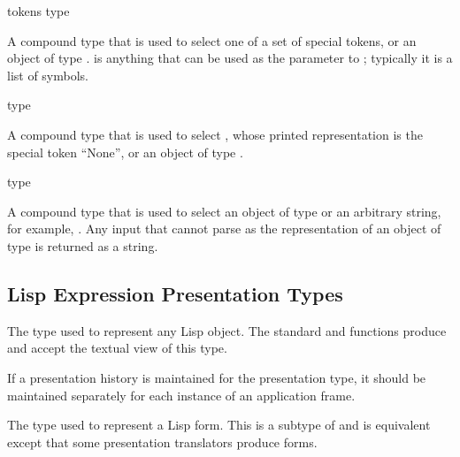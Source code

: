  {tokens type}

A compound type that is used to select one of a set of special tokens, or an
object of type .   is anything that can be used as the
 parameter to ; typically it is a list of
symbols.


 {type}

A compound type that is used to select , whose printed representation is
the special token ``None'', or an object of type .


 {type}

A compound type that is used to select an object of type  or an
arbitrary string, for example, .  Any input that
 cannot parse as the representation of an object of type 
is returned as a string.


\subsection {Lisp Expression Presentation Types}

 {}

The type used to represent any Lisp object.  The standard  and
 functions produce and accept the textual view of this type.

If a presentation history is maintained for the  presentation
type, it should be maintained separately for each instance of an application
frame.

 {}

The type used to represent a Lisp form.  This is a subtype of 
and is equivalent except that some presentation translators produce 
forms.
